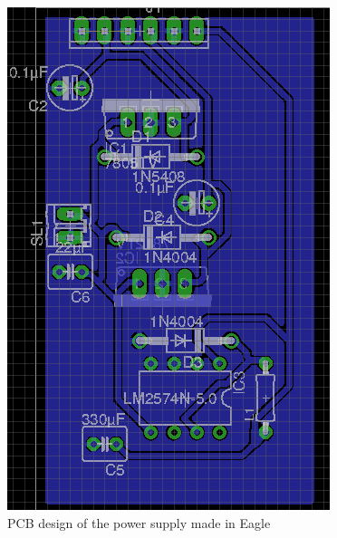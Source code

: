 \begin{figure}
\centering
\includegraphics[scale=0.5]{img/pcb_power.png}
\caption{PCB design of the power supply made in Eagle} 
\label{fig::pcb_power}
\end{figure}